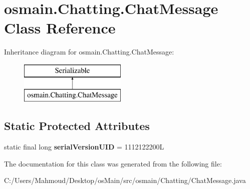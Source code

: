\hypertarget{classosmain_1_1_chatting_1_1_chat_message}{}\section{osmain.\+Chatting.\+Chat\+Message Class Reference}
\label{classosmain_1_1_chatting_1_1_chat_message}
Inheritance diagram for osmain.\+Chatting.\+Chat\+Message\+:\begin{figure}[H]
\begin{center}
\leavevmode
\includegraphics[height=2.000000cm]{classosmain_1_1_chatting_1_1_chat_message}
\end{center}
\end{figure}
\subsection*{Static Protected Attributes}
\begin{DoxyCompactItemize}
\item 
static final long {\bfseries serial\+Version\+U\+ID} = 1112122200L\hypertarget{classosmain_1_1_chatting_1_1_chat_message_a3a1f6f0dea7c2eba4e1ad2a5ed7e818d}{}\label{classosmain_1_1_chatting_1_1_chat_message_a3a1f6f0dea7c2eba4e1ad2a5ed7e818d}

\end{DoxyCompactItemize}


The documentation for this class was generated from the following file\+:\begin{DoxyCompactItemize}
\item 
C\+:/\+Users/\+Mahmoud/\+Desktop/os\+Main/src/osmain/\+Chatting/Chat\+Message.\+java\end{DoxyCompactItemize}
